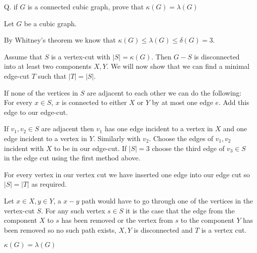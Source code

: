 Q. if $G$ is a connected cubic graph, prove that $\kappa(G) = \lambda(G)$

Let $G$ be a cubic graph. 

By Whitney's theorem we know that $\kappa(G) \le \lambda(G) \le \delta(G) = 3 $.

Assume that $S$ is a vertex-cut with $|S| = \kappa(G)$. Then
$G-S$ is disconnected into at least two components $X, Y$. 
We will now show that we can find a minimal edge-cut $T$ such that $|T| = |S|$.

If none of the vertices in $S$ are adjacent to each other we can do the following:
For every $x \in S$, $x$ is connected to either $X$ or $Y$ by at most one edge $e$. 
Add this edge to our edge-cut.

If $v_1, v_2 \in S$ are adjacent then $v_1$ has one edge incident to a vertex 
in $X$ and one edge incident to a vertex in $Y$. Similarly with $v_2$. Choose 
the edges of $v_1, v_2$ incident with $X$ to be in our edge-cut. If $|S| = 3$ 
choose the third edge of $v_3 \in S$ in the edge cut using the first method 
above. 


For every vertex in our vertex cut we have inserted one edge into our edge
cut so $|S| = |T|$ as required. 

Let $x\in X, y \in Y$, a $x-y$ path would have to go through one of the
vertices in the vertex-cut $S$. For any such vertex $s \in S$ it is the
case that the edge from the component $X$ to $s$ has been removed or the
vertex from $s$ to the component $Y$ has been removed so no such path
exists, $X, Y$ is disconnected and $T$ is a vertex cut. 

$\kappa(G) = \lambda(G)$
